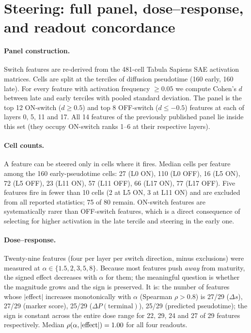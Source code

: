 \documentclass[10pt,letterpaper]{article}
\begin{document}
\section{Steering: full panel, dose--response, and readout concordance}
\label{supp:steering_full}

\paragraph{Panel construction.} Switch features are re-derived from the 481-cell Tabula Sapiens SAE activation matrices. Cells are split at the terciles of diffusion pseudotime (160 early, 160 late). For every feature with activation frequency $\geq 0.05$ we compute Cohen's $d$ between late and early terciles with pooled standard deviation. The panel is the top 12 ON-switch ($d\geq0.5$) and top 8 OFF-switch ($d\leq-0.5$) features at each of layers 0, 5, 11 and 17. All 14 features of the previously published panel lie inside this set (they occupy ON-switch ranks 1--6 at their respective layers).

\paragraph{Cell counts.} A feature can be steered only in cells where it fires. Median cells per feature among the 160 early-pseudotime cells: 27 (L0 ON), 110 (L0 OFF), 16 (L5 ON), 72 (L5 OFF), 23 (L11 ON), 57 (L11 OFF), 66 (L17 ON), 77 (L17 OFF). Five features fire in fewer than 10 cells (2 at L5 ON, 3 at L11 ON) and are excluded from all reported statistics; 75 of 80 remain. ON-switch features are systematically rarer than OFF-switch features, which is a direct consequence of selecting for higher activation in the late tercile and steering in the early one.

\paragraph{Dose--response.} Twenty-nine features (four per layer per switch direction, minus exclusions) were measured at $\alpha\in\{1.5,2,3,5,8\}$. Because most features push \emph{away} from maturity, the signed effect decreases with $\alpha$ for them; the meaningful question is whether the magnitude grows and the sign is preserved. It is: the number of features whose $|$effect$|$ increases monotonically with $\alpha$ (Spearman $\rho>0.8$) is 27/29 ($\Delta s$), 27/29 (marker score), 25/29 ($\Delta P(\mathrm{terminal})$), 25/29 (predicted pseudotime); the sign is constant across the entire dose range for 22, 29, 24 and 27 of 29 features respectively. Median $\rho(\alpha, |{\rm effect}|) = 1.00$ for all four readouts.
\end{document}
